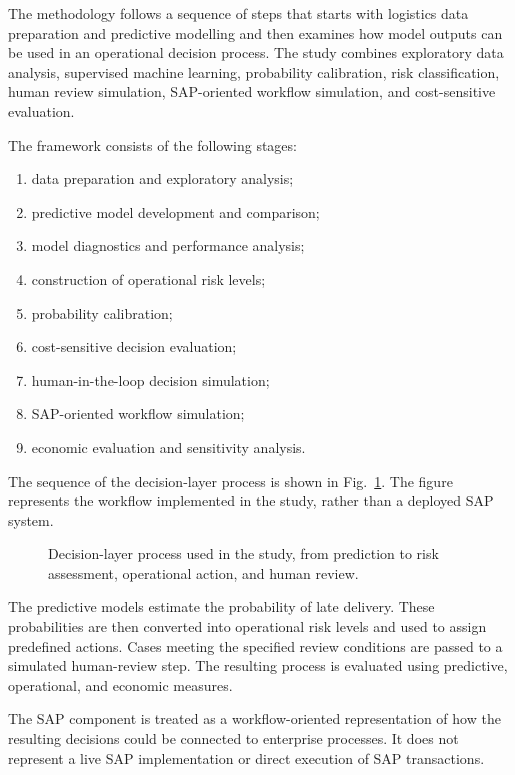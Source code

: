 \documentclass[manuscript, screen, review]{acmart}
\begin{document}
The methodology follows a sequence of steps that starts with logistics
data preparation and predictive modelling and then examines how model
outputs can be used in an operational decision process. The study
combines exploratory data analysis, supervised machine learning,
probability calibration, risk classification, human review simulation,
SAP-oriented workflow simulation, and cost-sensitive evaluation.

The framework consists of the following stages:
\begin{enumerate}
    \item data preparation and exploratory analysis;
    \item predictive model development and comparison;
    \item model diagnostics and performance analysis;
    \item construction of operational risk levels;
    \item probability calibration;
    \item cost-sensitive decision evaluation;
    \item human-in-the-loop decision simulation;
    \item SAP-oriented workflow simulation;
    \item economic evaluation and sensitivity analysis.
\end{enumerate}

The sequence of the decision-layer process is shown in
Fig.~\ref{fig:decision_pipeline}. The figure represents the workflow
implemented in the study, rather than a deployed SAP system.

\begin{figure}[htbp]
\centering

\caption{Decision-layer process used in the study, from prediction to
risk assessment, operational action, and human review.}
\label{fig:decision_pipeline}
\end{figure}

The predictive models estimate the probability of late delivery. These
probabilities are then converted into operational risk levels and used
to assign predefined actions. Cases meeting the specified review
conditions are passed to a simulated human-review step. The resulting
process is evaluated using predictive, operational, and economic
measures.

The SAP component is treated as a workflow-oriented representation of
how the resulting decisions could be connected to enterprise
processes. It does not represent a live SAP implementation or direct
execution of SAP transactions.
\end{document}

